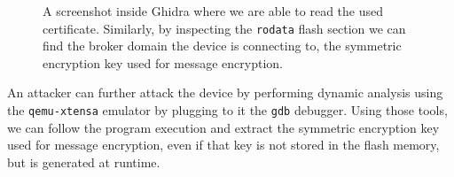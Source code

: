 \documentclass[conference]{IEEEtran}
\begin{document}
\begin{figure}[h]
    \centering
    \caption{A screenshot inside Ghidra where we are able to read the used certificate. Similarly, 
    by inspecting the \texttt{rodata} flash section we can find the broker domain the device is connecting to, the 
    symmetric encryption key used for message encryption.}
    \label{fig:ghidra}
\end{figure}

An attacker can further attack the device by performing dynamic analysis using the \texttt{qemu-xtensa} emulator
by plugging to it the \texttt{gdb} debugger. 
Using those tools, we can follow the program execution and extract the symmetric encryption key used for message encryption, 
even if that key is not stored in the flash memory, but is generated at runtime.
\end{document}
